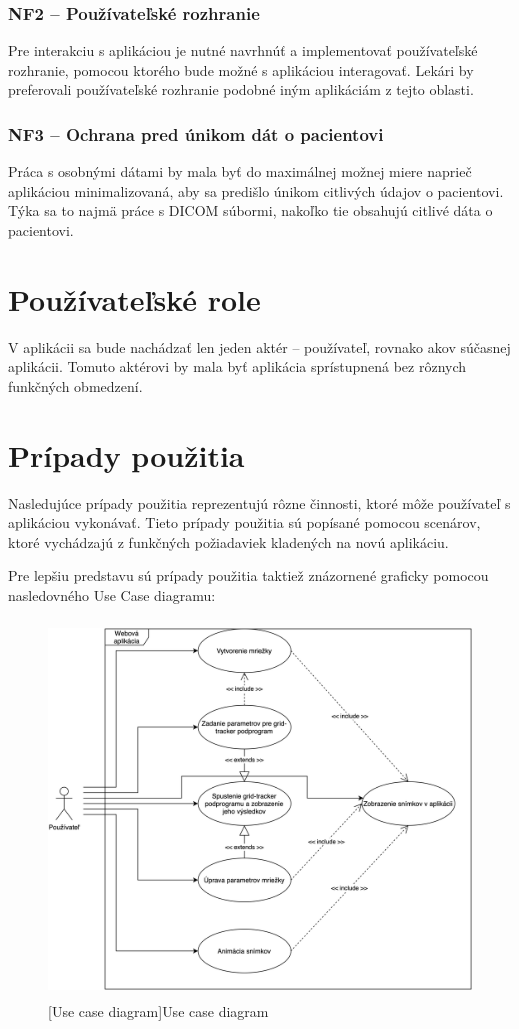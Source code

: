 \subsubsection {NF2 -- Používateľské rozhranie}
Pre interakciu s aplikáciou je nutné navrhnúť a implementovať používateľské rozhranie, pomocou ktorého bude možné s aplikáciou interagovať. Lekári by preferovali používateľské rozhranie podobné iným aplikáciám z tejto oblasti.

\subsubsection {NF3 -- Ochrana pred únikom dát o pacientovi}
Práca s osobnými dátami by mala byť do maximálnej možnej miere naprieč aplikáciou minimalizovaná, aby sa predišlo únikom citlivých údajov o pacientovi. Týka sa to najmä práce s DICOM súbormi, nakoľko tie obsahujú citlivé dáta o pacientovi.

\clearpage

\section {Používateľské role}
V aplikácii sa bude nachádzať len jeden aktér -- používateľ, rovnako ako\newline v súčasnej aplikácii. Tomuto aktérovi by mala byť aplikácia sprístupnená bez rôznych funkčných obmedzení.

\section {Prípady použitia}
Nasledujúce prípady použitia reprezentujú rôzne činnosti, ktoré môže používateľ s aplikáciou vykonávať. Tieto prípady použitia sú popísané pomocou scenárov, ktoré vychádzajú z funkčných požiadaviek kladených na novú aplikáciu.

Pre lepšiu predstavu sú prípady použitia taktiež znázornené graficky pomocou nasledovného Use Case diagramu:

\begin {figure}[H]
        \centering
        \includegraphics[height=10cm]{media/graphs/usecase.png}
        \captionsetup{justification=centering}
        [Use case diagram]{Use case diagram}
\end {figure}

